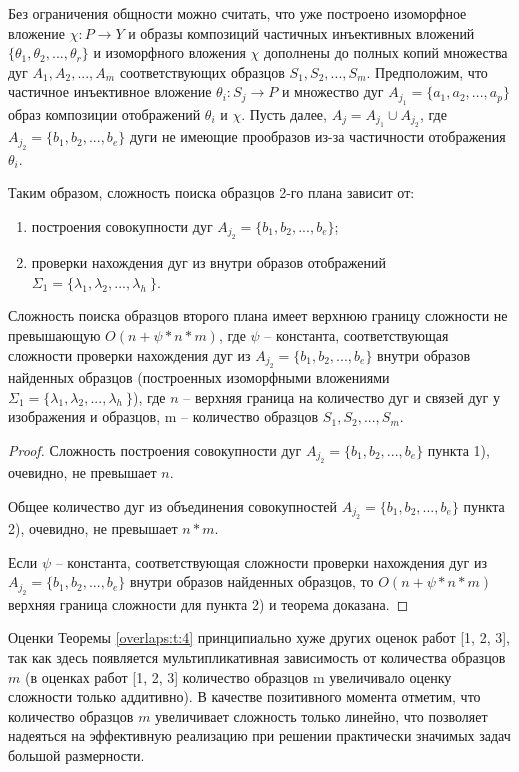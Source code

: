 Без ограничения общности можно считать, что уже построено изоморфное вложение  $\chi : P \to Y$  и образы композиций частичных инъективных вложений $\{\theta_1, \theta_2 ,..., \theta_r\}$ и изоморфного вложения $\chi$  дополнены до полных копий множества дуг  $A_1, A_2, ..., A_m$ соответствующих образцов  $S_1, S_2, ..., S_m$.  Предположим,  что частичное инъективное вложение  $\theta_i :  S_j \to P$  и  множество дуг  $A_{j_1} = \{ a_1, a_2 ,... , a_p\}$  образ композиции отображений  $\theta_i$  и $\chi$.  Пусть далее,  $A_j  =  A_{j_1} \cup A_{j_2}$, где  $A_{j_2}  =  \{ b_1, b_2 ,..., b_e\}$ дуги не имеющие прообразов из-за частичности отображения  $\theta_i$. 

Таким образом, сложность  поиска образцов 2-го плана зависит от:
\begin{enumerate}
\item построения  совокупности дуг $A_{j_2}  =  \{ b_1, b_2 ,..., b_e\}$;
\item проверки нахождения дуг из внутри  образов отображений  $\Sigma_1  =  \{\lambda_1, \lambda_2 ,..., \lambda_h\ \}$.
\end{enumerate}

\begin{theorem}
Сложность поиска образцов второго плана имеет верхнюю границу сложности не превышающую  
$O(n+\psi *n*m )$,  где  $\psi$  -- константа, соответствующая сложности проверки нахождения дуг из  $A_{j_2}  =  \{ b_1, b_2 ,..., b_e\}$  внутри  образов найденных образцов (построенных изоморфными вложениями $\Sigma_1  =  \{\lambda_1, \lambda_2 ,..., \lambda_h\ \}$),  где  $n$ -- верхняя граница на количество дуг и связей дуг у изображения и образцов,  m -- количество образцов  $S_1, S_2, ..., S_m$.
\label{overlaps:t:4}
\end{theorem}
\begin{proof}
Сложность построения совокупности дуг $A_{j_2}  =  \{ b_1, b_2 ,..., b_e\}$ пункта  1), очевидно, не превышает  $n$.

Общее количество дуг из объединения совокупностей  $A_{j_2}  =  \{ b_1, b_2 ,..., b_e\}$ пункта  2), очевидно, не превышает   $n*m$. 

Если  $\psi$  -- константа, соответствующая сложности проверки нахождения дуг из $A_{j_2}  =  \{ b_1, b_2 ,..., b_e\}$  внутри  образов найденных образцов,  то  $O(n+\psi *n*m )$ верхняя граница сложности для  пункта  2) и теорема доказана.
\end{proof}

\begin{remark}
Оценки Теоремы \ref{overlaps:t:4} принципиально хуже  других оценок работ
[1, 2, 3], так как здесь появляется мультипликативная зависимость  от количества образцов  $m$  (в оценках  работ [1, 2, 3] количество образцов  m  увеличивало оценку сложности  только аддитивно). В качестве позитивного момента отметим, что количество образцов  $m$ увеличивает сложность только линейно, что позволяет надеяться на эффективную реализацию при  решении практически значимых задач большой размерности.
\label{overlaps:r:3}
\end{remark}

